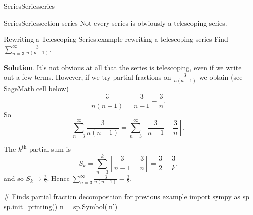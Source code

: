 \documentclass[oneside,10pt,]{book}
\numberwithin{equation}{section}
\begin{document}
\begin{chapterptx}{Series}{}{Series}{}{}{series}
\begin{sectionptx}{Series}{}{Series}{}{}{section-series}
\hypertarget{p-855}{}%
Not every series is obviously a telescoping series.%
\begin{example}{Rewriting a Telescoping Series.}{example-rewriting-a-telescoping-series}%
\hypertarget{p-856}{}%
Find \(\sum_{n=3}^{\infty}\frac{3}{n(n-1)}\).%
\par\smallskip%
\noindent\textbf{Solution}.\hypertarget{solution-178}{}\quad%
\hypertarget{p-857}{}%
It's not obvious at all that the series is telescoping, even if we write out a few terms. However, if we try partial fractions on \(\frac{3}{n(n-1)}\) we obtain (see SageMath cell below)%
\begin{equation*}
\frac{3}{n(n-1)} = \frac{3}{n - 1} - \frac{3}{n}\text{.}
\end{equation*}
So%
\begin{equation*}
\sum_{n=3}^{\infty}\frac{3}{n(n-1)} = \sum_{n=3}^{\infty}\left[\frac{3}{n-1} - \frac{3}{n}\right]\text{.}
\end{equation*}
%
\par
\hypertarget{p-858}{}%
The \(k^{\text{th}}\) partial sum is%
\begin{equation*}
S_{k} = \sum_{n=3}^{k}\left[\frac{3}{n-1} - \frac{3}{n}\right] = \frac{3}{2} - \frac{3}{k}\text{,}
\end{equation*}
and so \(S_{k}\to \frac{3}{2}\). Hence \(\sum_{n=3}^{\infty}\frac{3}{n(n-1)} = \frac{3}{2}\).%
\end{example}
\begin{sageinput}
# Finds partial fraction decomposition for previous example
import sympy as sp
sp.init_printing()
n = sp.Symbol('n')


\end{sageinput}
\end{sectionptx}
\end{chapterptx}
\end{document}
